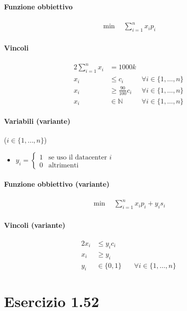 \documentclass{article}
\begin{document}
\paragraph{Funzione obbiettivo}
\begin{align*}
  \min \quad \sum_{i=1}^n x_i p_i
\end{align*}

\paragraph{Vincoli}
\begin{alignat}{2}
  \sum_{i=1}^n x_i &= 1000k &\\
  x_i &\leq c_i &\forall i \in \{1,\ldots,n\}\\
  x_i &\geq \frac{90}{100} c_i &\forall i \in \{1,\ldots,n\}\\
  x_i &\in \mathbb{N} \quad &\forall i \in \{1,\ldots,n\}
\end{alignat}

\paragraph{Variabili (variante)} ($i \in \{1,\ldots,n\}$)
\begin{itemize}
  \item $y_i = \begin{cases}
    1 &\text{se uso il datacenter }i\\
    0 &\text{altrimenti}
  \end{cases}$
\end{itemize}

\paragraph{Funzione obbiettivo (variante)}
\begin{align*}
  \min \quad \sum_{i=1}^n x_i p_i + y_i s_i
\end{align*}

\paragraph{Vincoli (variante)}
\begin{alignat}{2}
  x_i &\leq y_i c_i\\
  x_i &\geq y_i\\
  y_i &\in \{0,1\} \quad &\forall i \in \{1,\ldots,n\}
\end{alignat}

\pagebreak
\section{Esercizio 1.52}
\end{document}
